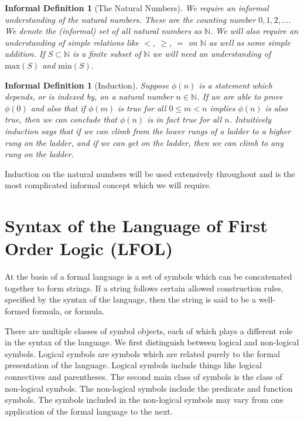 \documentclass[12pt]{article}
\theoremstyle{break}
\theoremstyle{break}
\theoremstyle{break}
\theoremstyle{break}
\theoremstyle{break}
\newtheorem{informal definition}[definition]{Informal Definition}
\begin{document}
\begin{informal definition}[The Natural Numbers]
We require an informal understanding of the natural numbers.
These are the counting number $0, 1, 2, \ldots$.
We denote the (informal) set of all natural numbers as $\mathbb{N}$.
We will also require an understanding of simple relations like $<$, $\ge$, $=$ on $\mathbb{N}$ as well as some simple addition.
If $S\subset \mathbb{N}$ is a finite subset of $\mathbb{N}$ we will need an understanding of $\text{max}(S)$ and $\text{min}(S)$.
\end{informal definition}

\begin{informal definition}[Induction]
Suppose $\phi(n)$ is a statement which depends, or is indexed by, on a natural number $n\in\mathbb{N}$.
If we are able to prove $\phi(0)$ and also that if $\phi(m)$ is true for all $0\le m < n$ implies $\phi(n)$ is also true, then we can conclude that $\phi(n)$ is in fact true for all $n$.
Intuitively induction says that if we can climb from the lower rungs of a ladder to a higher rung on the ladder, and if we can get on the ladder, then we can climb to any rung on the ladder.
\end{informal definition}
Induction on the natural numbers will be used extensively throughout and is the most complicated informal concept which we will require.


\newpage
\section{Syntax of the Language of First Order Logic (LFOL)}

At the basis of a formal language is a set of symbols which can be concatenated together to form strings.
If a string follows certain allowed construction rules, specified by the syntax of the language, then the string is said to be a well-formed formula, or formula.

There are multiple classes of symbol objects, each of which plays a different role in the syntax of the language.
We first distinguish between logical and non-logical symbols.
Logical symbols are symbols which are related purely to the formal presentation of the language.
Logical symbols include things like logical connectives and parentheses.
The second main class of symbols is the class of non-logical symbols.
The non-logical symbols include the predicate and function symbols.
The symbols included in the non-logical symbols may vary from one application of the formal language to the next.
\end{document}

